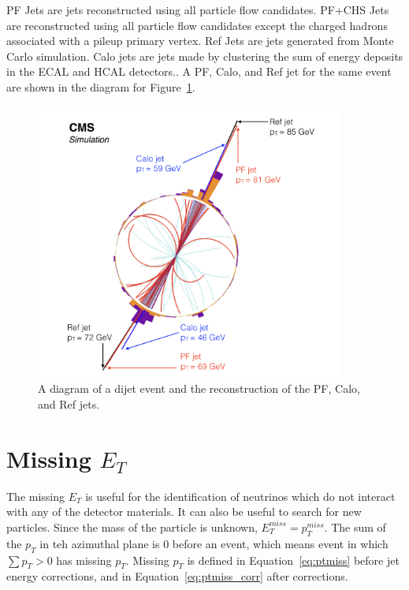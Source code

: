 PF Jets are jets reconstructed using all particle flow candidates. PF+CHS Jets are reconstructed using all particle flow candidates except the charged hadrons associated with a pileup primary vertex. Ref Jets are jets generated from Monte Carlo simulation. Calo jets are jets made by clustering the sum of energy deposits in the ECAL and HCAL detectors.. A PF, Calo, and Ref jet for the same event are shown in the diagram for Figure~\ref{fig:pfjet}.

\begin{figure}[h]
\centering
\includegraphics[width=0.9\textwidth]{figures/pf_jet_diagram}
\caption{A diagram of a dijet event and the reconstruction of the PF, Calo, and Ref jets.}
\label{fig:pfjet}
\end{figure}




\section{Missing $E_T$}

The missing $E_T$ is useful for the identification of neutrinos which do not interact with any of the detector materials. It can also be useful to search for new particles. Since the mass of the particle is unknown, $E^{miss}_{T} = p^{miss}_{T}$. The sum of the $p_T$ in teh azimuthal plane is 0 before an event, which means event in which $\sum p_{T} > 0$ has missing $p_T$. Missing $p_T$ is defined in Equation~\ref{eq:ptmiss} before jet energy corrections, and in Equation~\ref{eq:ptmiss_corr} after corrections.

